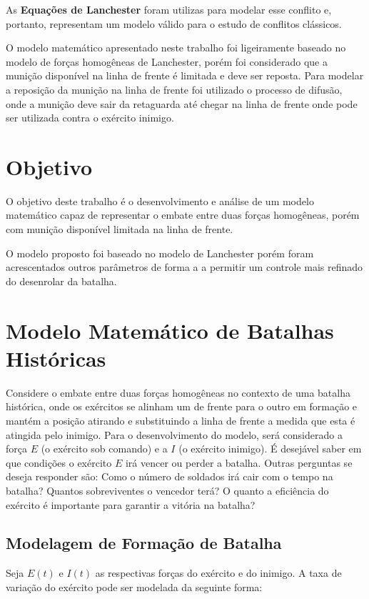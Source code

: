 \documentclass{article}
\begin{document}
As \textbf{Equações de Lanchester} foram utilizas para modelar esse conflito e, portanto, representam um modelo válido para o estudo de conflitos clássicos.

O modelo matemático apresentado neste trabalho foi ligeiramente baseado no modelo de forças homogêneas de Lanchester, porém foi considerado que a munição disponível na linha de frente é limitada e deve ser reposta. Para modelar a reposição da munição na linha de frente foi utilizado o processo de difusão, onde a munição deve sair da retaguarda até chegar na linha de frente onde pode ser utilizada contra o exército inimigo.

\section{Objetivo}

O objetivo deste trabalho é o desenvolvimento e análise de um modelo matemático capaz de representar o embate entre duas forças homogêneas, porém com munição disponível limitada na linha de frente. 

O modelo proposto foi baseado no modelo de Lanchester porém foram acrescentados outros parâmetros de forma a a permitir um controle mais refinado do desenrolar da batalha. 

\section{Modelo Matemático de Batalhas Históricas}

Considere o embate entre duas forças homogêneas no contexto de uma batalha histórica, onde os exércitos se alinham um de frente para o outro em formação e mantém a posição atirando e substituindo a linha de frente a medida que esta é atingida pelo inimigo. Para o desenvolvimento do modelo, será considerado a força $E$ (o exército sob comando) e a $I$ (o exército inimigo). É desejável saber em que condições o exército $E$ irá vencer ou perder a batalha. Outras perguntas se deseja responder são: Como o número de soldados irá cair com o tempo na batalha? Quantos sobreviventes o vencedor terá? O quanto a eficiência do exército é importante para garantir a vitória na batalha?

\subsection{Modelagem de Formação de Batalha}
\label{sec:model}

Seja $E(t)$ e $I(t)$ as respectivas forças do exército e do inimigo. A taxa de variação do exército pode ser modelada da seguinte forma:
\end{document}
